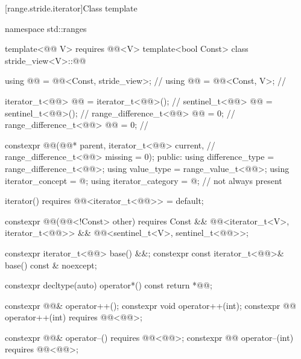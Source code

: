 [range.stride.iterator]{Class template }

\begin{codeblock}
namespace std::ranges {
  template<@@ V>
    requires @@<V>
  template<bool Const>
  class stride_view<V>::@@ {
    using @@ = @@<Const, stride_view>;                      // \expos
    using @@ = @@<Const, V>;                                  // \expos

    iterator_t<@@> @@ = iterator_t<@@>();                      // \expos
    sentinel_t<@@> @@ = sentinel_t<@@>();                          // \expos
    range_difference_t<@@> @@ = 0;                                // \expos
    range_difference_t<@@> @@ = 0;                               // \expos

    constexpr @@(@@* parent, iterator_t<@@> current,        // \expos
                       range_difference_t<@@> missing = 0);
  public:
    using difference_type = range_difference_t<@@>;
    using value_type = range_value_t<@@>;
    using iterator_concept = @\seebelow@;
    using iterator_category = @\seebelow@;    // not always present

    iterator() requires @@<iterator_t<@@>> = default;

    constexpr @@(@@<!Const> other)
      requires Const && @@<iterator_t<V>, iterator_t<@@>>
                     && @@<sentinel_t<V>, sentinel_t<@@>>;

    constexpr iterator_t<@@> base() &&;
    constexpr const iterator_t<@@>& base() const & noexcept;

    constexpr decltype(auto) operator*() const { return *@@; }

    constexpr @@& operator++();
    constexpr void operator++(int);
    constexpr @@ operator++(int) requires @@<@@>;

    constexpr @@& operator--() requires @@<@@>;
    constexpr @@ operator--(int) requires @@<@@>;

}}
\end{codeblock}
